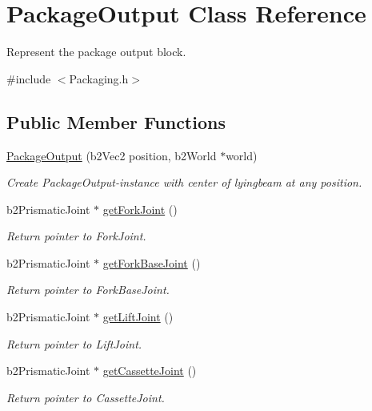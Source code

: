 \hypertarget{classPackageOutput}{\section{Package\-Output Class Reference}
\label{classPackageOutput}
}


Represent the package output block.  




{\ttfamily \#include $<$Packaging.\-h$>$}

\subsection*{Public Member Functions}
\begin{DoxyCompactItemize}
\item 
\hyperlink{classPackageOutput_a81bd389107afdc3df10c63f29d971458}{Package\-Output} (b2\-Vec2 position, b2\-World $\ast$world)
\begin{DoxyCompactList}\small\item\em Create Package\-Output-\/instance with center of lyingbeam at any position. \end{DoxyCompactList}\item 
b2\-Prismatic\-Joint $\ast$ \hyperlink{classPackageOutput_a1189dbd68b0da4c9a9d52fe8e826d5c3}{get\-Fork\-Joint} ()
\begin{DoxyCompactList}\small\item\em Return pointer to Fork\-Joint. \end{DoxyCompactList}\item 
b2\-Prismatic\-Joint $\ast$ \hyperlink{classPackageOutput_a67d6e0558552cbee8bba8cc360f7eb3c}{get\-Fork\-Base\-Joint} ()
\begin{DoxyCompactList}\small\item\em Return pointer to Fork\-Base\-Joint. \end{DoxyCompactList}\item 
b2\-Prismatic\-Joint $\ast$ \hyperlink{classPackageOutput_a1f5bad1afb58f37b8b2e49a4d198a69f}{get\-Lift\-Joint} ()
\begin{DoxyCompactList}\small\item\em Return pointer to Lift\-Joint. \end{DoxyCompactList}\item 
b2\-Prismatic\-Joint $\ast$ \hyperlink{classPackageOutput_a250ae49ec134d5b9b853acdbd91707ea}{get\-Cassette\-Joint} ()
\begin{DoxyCompactList}\small\item\em Return pointer to Cassette\-Joint. \end{DoxyCompactList}\item 

\end{DoxyCompactItemize}
